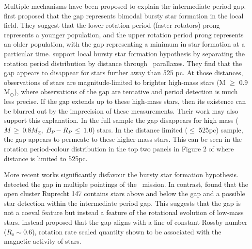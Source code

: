 Multiple mechanisms have been proposed to explain the intermediate period gap.
\citet{mcquillan_rotation_2014} first proposed that the gap represents bimodal bursty star formation in the local \kepler{} field.
They suggest that the lower rotation period (faster rotators) prong represents a younger population, and the upper rotation period prong represents an older population, with the gap representing a minimum in star formation at a particular time.
\citet{davenport_rotating_2018} support local bursty star formation hypothesis by separating the \kepler{} rotation period distribution by distance through \gaia{} \ parallaxes.
They find that the gap appears to disappear for stars further away than 525 pc.
At those distances, observations of stars are magnitude-limited to brighter high-mass stars (M $\geq$ 0.9 M$_{\odot}$), where observations of the gap are tentative and period detection is much less precise.
If the gap extends up to these high-mass stars, then its existence can be blurred out by the imprecision of these measurements.
Their work may also support this explanation.
In the full \citep{mcquillan_rotation_2014} sample the gap disappears for high mass ($M \ \geq \ 0.8 M_{\odot}$, $B_P - R_P \ \leq \ 1.0$) stars.
In the distance limited ($\leq$ 525pc) sample, the gap appears to permeate to these higher-mass stars. 
This can be seen in the rotation period-colour distribution in the top two panels in Figure 2 of \citet{davenport_rotating_2018} where distance is limited to 525pc.

More recent works significantly disfavour the bursty star formation hypothesis.
\citet{gordon_stellar_2021} detected the gap in multiple pointings of the \ktoo \ mission. 
In contrast, \citet{curtis_when_2020} found that the open cluster Ruprecht 147 contains stars above and below the gap and a possible star detection within the intermediate period gap.
This suggests that the gap is not a coeval feature but instead a feature of the rotational evolution of low-mass stars.
\citet{curtis_when_2020} instead proposed that the gap aligns with a line of constant Rossby number ($R_o\sim 0.6$), rotation rate scaled quantity shown to be associated with the magnetic activity of stars.

